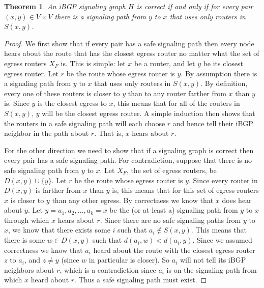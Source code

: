 \documentclass[11pt,letterpaper]{article}
\newtheorem{theorem}{Theorem}[section]
\theoremstyle{definition}
\begin{document}
\begin{theorem} \label{thm:iBGP_safe_sets} An iBGP signaling graph $H$
  is correct if and only if for every pair $(x,y) \in V \times V$
  there is a signaling path from $y$ to $x$ that uses only routers in
  $S(x,y)$.
\end{theorem}
\begin{proof}
  We first show that if every pair has a safe signaling path then every
  node hears about the route that has the
  closest egress router no matter what the set of
  egress routers $X_F$ is.  This is simple: let $x$ be a router, and let $y$ be its
  closest egress router. Let $r$ be the route whose egress router is $y$.
  By assumption there is a signaling path from $y$ to $x$
  that uses only routers in $S(x,y)$.  By definition, every one of these
  routers is closer to $y$ than to any router farther from $x$ than $y$
  is.  Since $y$ is the closest egress to $x$, this means that for all of
  the routers in $S(x,y)$, $y$ will be the closest egress router.
  A simple induction then shows that the routers in a safe signaling
  path will each choose $r$ and hence tell their iBGP neighbor in the
  path about $r$.
  That is, $x$ hears about $r$.

  For the other direction we need to show that if a signaling graph
  is correct then every pair has a safe signaling path.  For
  contradiction, suppose that there is no safe signaling path from $y$
  to $x$.  Let $X_F$, the set of egress routers, be $D(x,y)
  \cup \{y\}$.  Let $r$ be the route whose egress router is $y$.
  Since every router in $D(x,y)$ is farther from $x$ than
  $y$ is, this means that for this set of egress routers $x$ is closer to $y$
  than any other egress.  By correctness we know that $x$ does hear about
  $y$.  Let $y = a_1, a_2, \dots, a_k = x$ be the (or at least a)
  signaling path from $y$ to $x$ through which $x$ hears about $r$.
  Since there are no safe signaling paths from $y$ to $x$, we know that
  there exists some $i$ such that $a_i \not\in S(x,y)$.  This means that
  there is some $w \in D(x,y)$ such that $d(a_i, w) < d(a_i, y)$.  Since
  we assumed correctness we know that $a_i$ heard about the route with
  the closest egress router $z$ to $a_i$, and $z\not= y$
  (since $w$ in particular is closer).
  So $a_i$ will not tell its iBGP neighbors about $r$,
  which is a contradiction since $a_i$ is
  on the signaling path from which $x$ heard about $r$.  Thus a safe
  signaling path must exist.
\end{proof}
\end{document}
